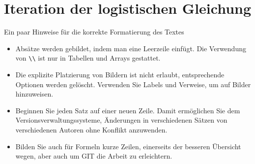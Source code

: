 %
%
%
\chapter{Iteration der logistischen Gleichung\label{chapter:logistic}}
\begin{refsection}

Ein paar Hinweise für die korrekte Formatierung des Textes
\begin{itemize}
\item
Absätze werden gebildet, indem man eine Leerzeile einfügt.
Die Verwendung von \verb+\\+ ist nur in Tabellen und Arrays gestattet.
\item
Die explizite Platzierung von Bildern ist nicht erlaubt, entsprechende
Optionen werden gelöscht. 
Verwenden Sie Labels und Verweise, um auf Bilder hinzuweisen.
\item
Beginnen Sie jeden Satz auf einer neuen Zeile. 
Damit ermöglichen Sie dem Versionsverwaltungssysteme, Änderungen
in verschiedenen Sätzen von verschiedenen Autoren ohne Konflikt 
anzuwenden.
\item 
Bilden Sie auch für Formeln kurze Zeilen, einerseits der besseren
Übersicht wegen, aber auch um GIT die Arbeit zu erleichtern.
\end{itemize}






\printbibliography[heading=subbibliography]
\end{refsection}
